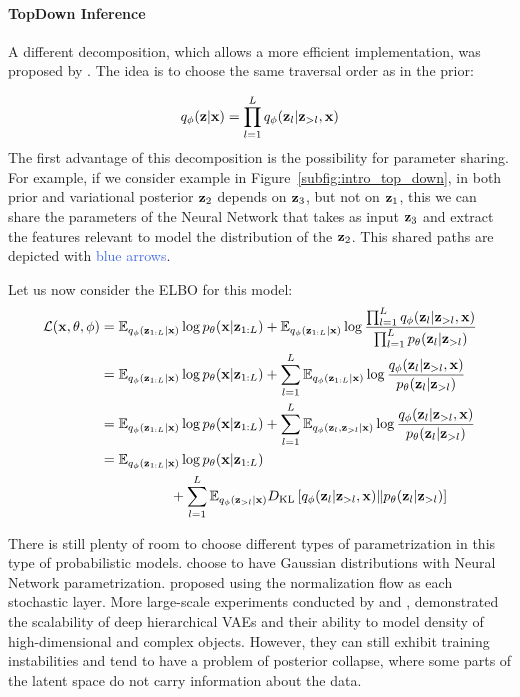 \paragraph{TopDown Inference}
A different decomposition, which allows a more efficient implementation, was proposed by \citet{sonderby2016ladder}.  The idea is to choose the same traversal order as in the prior:

\begin{equation}
    q_{\phi}({\mathbf{z}}|{\mathbf{x}}) = \prod_{l=1}^L q_{\phi}({\mathbf{z}}_l|{\mathbf{z}}_{>l}, {\mathbf{x}})
\end{equation}
The first advantage of this decomposition is the possibility for parameter sharing. For example, if we consider example in Figure~\ref{subfig:intro_top_down}, in both prior and variational posterior ${\mathbf{z}}_2$ depends on ${\mathbf{z}}_3$, but not on ${\mathbf{z}}_1$, this we can share the parameters of the Neural Network that takes as input ${\mathbf{z}}_3$ and extract the features relevant to model the distribution of the ${\mathbf{z}}_2$. This shared paths are depicted with \textcolor{RoyalBlue}{blue arrows}.

Let us now consider the ELBO for this model:
\begin{align}
    \mathcal{L}({\mathbf{x}}, \theta, \phi) &= \mathbb{E}_{q_{\phi}({\mathbf{z}}_{1:L}|{\mathbf{x}})}\log p_{\theta}({\mathbf{x}}|{\mathbf{z}}_{1:L}) + \mathbb{E}_{q_{\phi}({\mathbf{z}}_{1:L}|{\mathbf{x}})} \log \frac{\prod_{l=1}^L q_{\phi}({\mathbf{z}}_l|{\mathbf{z}}_{>l}, {\mathbf{x}})}{\prod_{l=1}^L p_{\theta}({\mathbf{z}}_l|{\mathbf{z}}_{>l})} \\
    &=\mathbb{E}_{q_{\phi}({\mathbf{z}}_{1:L}|{\mathbf{x}})}\log p_{\theta}({\mathbf{x}}|{\mathbf{z}}_{1:L}) +  \sum_{l=1}^L \mathbb{E}_{q_{\phi}({\mathbf{z}}_{1:L}|{\mathbf{x}})}\log \frac{ q_{\phi}({\mathbf{z}}_l|{\mathbf{z}}_{>l}, {\mathbf{x}})}{p_{\theta}({\mathbf{z}}_l|{\mathbf{z}}_{>l})} \\
    &=\mathbb{E}_{q_{\phi}({\mathbf{z}}_{1:L}|{\mathbf{x}})}\log p_{\theta}({\mathbf{x}}|{\mathbf{z}}_{1:L}) +  \sum_{l=1}^L \mathbb{E}_{q_{\phi}({\mathbf{z}}_{l},{\mathbf{z}}_{>l}| {\mathbf{x}})}\log \frac{ q_{\phi}({\mathbf{z}}_l|{\mathbf{z}}_{>l}, {\mathbf{x}})}{p_{\theta}({\mathbf{z}}_l|{\mathbf{z}}_{>l})} \\
    &=\mathbb{E}_{q_{\phi}({\mathbf{z}}_{1:L}|{\mathbf{x}})}\log p_{\theta}({\mathbf{x}}|{\mathbf{z}}_{1:L}) \notag\\
    &\quad\quad\quad\quad\quad +  \sum_{l=1}^L \mathbb{E}_{q_{\phi}({\mathbf{z}}_{>l}| {\mathbf{x}})}D_{\mathrm{KL}}\left[q_{\phi}({\mathbf{z}}_l|{\mathbf{z}}_{>l}, {\mathbf{x}})\|p_{\theta}({\mathbf{z}}_l|{\mathbf{z}}_{>l})\right] 
\end{align}

There is still plenty of room to choose different types of parametrization in this type of probabilistic models. 
\citet{sonderby2016ladder} choose to have Gaussian distributions with Neural Network parametrization. 
\citet{kingma2016improved} proposed using the normalization flow as each stochastic layer. 
More large-scale experiments conducted by \citet{vahdat2020nvae} and \citet{Child2020-ze}, demonstrated the scalability of deep hierarchical VAEs and their ability to model density of high-dimensional and complex objects.
However, they can still exhibit training instabilities and tend to have a problem of posterior collapse, where some parts of the latent space do not carry information about the data. 

